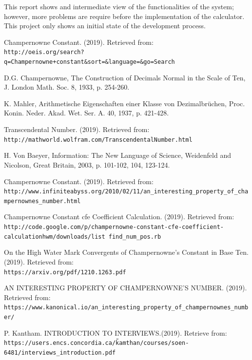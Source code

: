 \documentclass{report}
\begin{document}
This report shows and intermediate view of the functionalities of the system; however, more problems are require before the implementation of the calculator. This project only shows an initial state of the development process.

\newpage
\begin{thebibliography}{9}

Champernowne Constant. (2019). Retrieved from: \\\texttt{http://oeis.org/search?q=Champernowne+constant\&sort=\&language=\&go=Search}

D.G. Champernowne, The Construction of Decimals Normal in the Scale of Ten, J. London Math. Soc. 8, 1933, p. 254-260.
 
K. Mahler, Arithmetische Eigenschaften einer Klasse von Dezimalbrüchen, Proc. Konin. Neder. Akad. Wet. Ser. A. 40, 1937, p. 421-428.
 

Transcendental Number. (2019). Retrieved from:  \\\texttt{http://mathworld.wolfram.com/TranscendentalNumber.html}

H. Von Baeyer, Information: The New Language of Science, Weidenfeld and Nicolson, Great Britain, 2003, p. 101-102, 104, 123-124. 

Champernowne Constant. (2019). Retrieved from:  \\\texttt{http://www.infiniteabyss.org/2010/02/11/an\_interesting\_property\_of\_champernownes\_number.html}

Champernowne Constant cfe Coefficient Calculation. (2019). Retrieved from: \\\texttt{http://code.google.com/p/champernowne-constant-cfe-coefficient-calculationhwm/downloads/list find\_num\_pos.rb}

On the High Water Mark Convergents of Champernowne’s Constant in Base Ten. (2019). Retrieved from: \\\texttt{https://arxiv.org/pdf/1210.1263.pdf}

AN INTERESTING PROPERTY OF CHAMPERNOWNE'S NUMBER.  (2019). Retrieved from: \\\texttt{https://www.kanonical.io/an\_interesting\_property\_of\_champernownes\_number/}

P. Kantham. INTRODUCTION TO INTERVIEWS.(2019). Retrieve from:
\\\texttt{https://users.encs.concordia.ca/\~kamthan/courses/soen-6481/interviews\_introduction.pdf}


\end{thebibliography}
\end{document}
